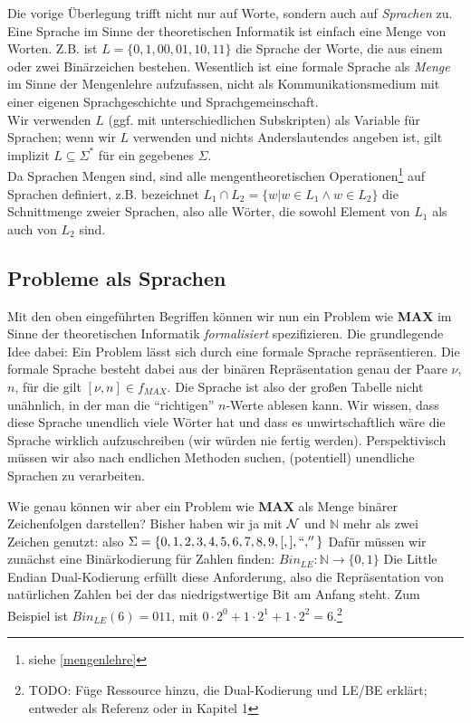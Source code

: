 Die vorige Überlegung trifft nicht nur auf Worte, sondern auch auf \emph{Sprachen} zu.
Eine Sprache im Sinne der theoretischen Informatik ist einfach eine Menge von Worten.
Z.B. ist $L = \{0, 1, 00, 01, 10, 11 \}$ die Sprache der Worte,
die aus einem oder zwei Binärzeichen bestehen.
Wesentlich ist eine formale Sprache als \emph{Menge} im Sinne der Mengenlehre aufzufassen, 
nicht als Kommunikationsmedium mit einer eigenen Sprachgeschichte und Sprachgemeinschaft.\\

\noindent
Wir verwenden $L$ (ggf. mit unterschiedlichen Subskripten) als Variable für Sprachen;
wenn wir $L$ verwenden und nichts Anderslautendes angeben ist,
gilt implizit $L \subseteq \Sigma^*$ für ein gegebenes $\Sigma$.\\

\noindent
Da Sprachen Mengen sind,
sind alle mengentheoretischen Operationen\footnote{siehe \autoref{mengenlehre}}
auf Sprachen definiert,
z.B. bezeichnet $L_1 \cap L_2 = \{w | w \in L_1 \wedge w \in L_2\}$
die Schnittmenge zweier Sprachen, also alle Wörter,
die sowohl Element von $L_1$ als auch von $L_2$ sind.

\subsection{Probleme als Sprachen}
Mit den oben eingeführten Begriffen können
wir nun ein Problem wie \textbf{MAX} im Sinne der theoretischen Informatik
\emph{formalisiert} spezifizieren.
Die grundlegende Idee dabei: Ein Problem lässt sich durch eine formale Sprache repräsentieren. 
Die formale Sprache besteht dabei aus der binären Repräsentation genau der Paare $\nu$, $n$,
für die gilt $[\nu, n] \in f_{MAX}$. 
Die Sprache ist also der großen Tabelle nicht unähnlich,
in der man die ``richtigen'' $n$-Werte ablesen kann.
Wir wissen, dass diese Sprache unendlich viele Wörter hat und dass es unwirtschaftlich wäre
die Sprache wirklich aufzuschreiben (wir würden nie fertig werden).
Perspektivisch müssen wir also nach endlichen Methoden suchen,
(potentiell) unendliche Sprachen zu verarbeiten.

Wie genau können wir aber ein Problem wie \textbf{MAX}
als Menge binärer Zeichenfolgen darstellen?
Bisher haben wir ja mit $\cal{N}$ und $\mathbb{N}$ mehr als zwei Zeichen genutzt:
also $\Sigma = \{0,1,2,3,4,5,6,7,8,9,[,],``,''\}$
Dafür müssen wir zunächst eine Binärkodierung für Zahlen finden:
$Bin_{LE}: \mathbb{N} \rightarrow \{0,1\}$
Die Little Endian Dual-Kodierung erfüllt diese Anforderung,
also die Repräsentation von natürlichen Zahlen bei der
das niedrigstwertige Bit am Anfang steht.
Zum Beispiel ist $Bin_{LE}(6) = 011$, mit 
$
0 \cdot 2^0
+ 1 \cdot 2^1
+ 1 \cdot 2^2
= 6
$.\footnote{TODO: Füge Ressource hinzu, die Dual-Kodierung und LE/BE erklärt;
entweder als Referenz oder in Kapitel 1}

